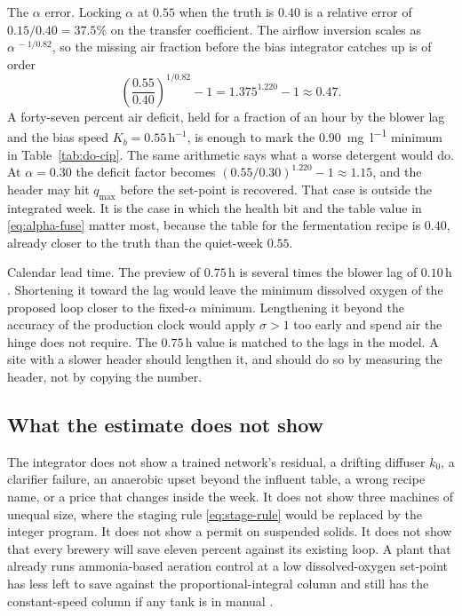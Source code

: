 The $\alpha$ error. Locking $\alpha$ at $0.55$ when the truth is $0.40$ is a relative error of $0.15/0.40=37.5\%$ on the transfer coefficient. The airflow inversion scales as $\alpha^{\,-1/0.82}$, so the missing air fraction before the bias integrator catches up is of order
\begin{equation}
\left(\frac{0.55}{0.40}\right)^{1/0.82}
-
1
=
1.375^{1.220}
-
1
\approx
0.47.
\end{equation}
A forty-seven percent air deficit, held for a fraction of an hour by the blower lag and the bias speed $K_{b}=0.55\,\mathrm{h^{-1}}$, is enough to mark the \SI{0.90}{\milli\gram\per\litre} minimum in Table~\ref{tab:do-cip}. The same arithmetic says what a worse detergent would do. At $\alpha=0.30$ the deficit factor becomes $(0.55/0.30)^{1.220}-1\approx 1.15$, and the header may hit $q_{\max}$ before the set-point is recovered. That case is outside the integrated week. It is the case in which the health bit and the table value in \eqref{eq:alpha-fuse} matter most, because the table for the fermentation recipe is $0.40$, already closer to the truth than the quiet-week $0.55$.

Calendar lead time. The preview of $0.75\,\mathrm{h}$ is several times the blower lag of $0.10\,\mathrm{h}$. Shortening it toward the lag would leave the minimum dissolved oxygen of the proposed loop closer to the fixed-$\alpha$ minimum. Lengthening it beyond the accuracy of the production clock would apply $\sigma>1$ too early and spend air the hinge does not require. The $0.75\,\mathrm{h}$ value is matched to the lags in the model. A site with a slower header should lengthen it, and should do so by measuring the header, not by copying the number.

\subsection{What the estimate does not show}

The integrator does not show a trained network's residual, a drifting diffuser $k_{0}$, a clarifier failure, an anaerobic upset beyond the influent table, a wrong recipe name, or a price that changes inside the week. It does not show three machines of unequal size, where the staging rule \eqref{eq:stage-rule} would be replaced by the integer program. It does not show a permit on suspended solids. It does not show that every brewery will save eleven percent against its existing loop. A plant that already runs ammonia-based aeration control at a low dissolved-oxygen set-point has less left to save against the proportional-integral column and still has the constant-speed column if any tank is in manual \cite{rieger2014abac,amand2012optimal,longo2016}.

